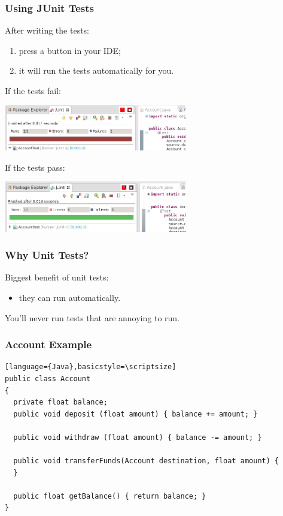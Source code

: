 \begin{frame}
\frametitle{Using JUnit Tests}

\begin{changemargin}{1cm}

After writing the tests:
\begin{enumerate}
\item press a button in your IDE;
\item it will run the tests automatically for you.
\end{enumerate}
\end{changemargin}

If the tests fail:

\begin{center}
\includegraphics[width=0.6\textwidth]{images/fail.png}
\end{center}

If the tests pass:

\begin{center}
\includegraphics[width=0.6\textwidth]{images/pass.png}
\end{center}

\end{frame}

\begin{frame}
\frametitle{Why Unit Tests?}

\begin{changemargin}{1cm}
Biggest benefit of unit tests:
\begin{itemize}
\item they can run automatically.
\end{itemize}
You'll never run tests that are annoying to run.

\end{changemargin}
\end{frame}


\begin{frame}[fragile]
\frametitle{Account Example}

\begin{verbatim}[language={Java},basicstyle=\scriptsize]
public class Account
{
  private float balance;
  public void deposit (float amount) { balance += amount; }

  public void withdraw (float amount) { balance -= amount; }

  public void transferFunds(Account destination, float amount) {
  }

  public float getBalance() { return balance; }
}
\end{verbatim}

\end{frame}


